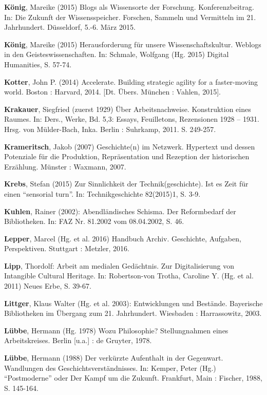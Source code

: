 \documentclass[a4paper,
fontsize=11pt,
oneside,
numbers=noperiodatend,
parskip=half-,
bibliography=totoc,
final
]{scrartcl}
\begin{document}
\textbf{König}, Mareike (2015) Blogs als Wissensorte der Forschung.
Konferenzbeitrag. In: Die Zukunft der Wissensspeicher. Forschen, Sammeln
und Vermitteln im 21. Jahrhundert. Düsseldorf, 5.-6. März 2015.

\textbf{König}, Mareike (2015) Herausforderung für unsere
Wissenschaftskultur. Weblogs in den Geisteswissenschaften. In: Schmale,
Wolfgang (Hg. 2015) Digital Humanities, S. 57-74.

\textbf{Kotter}, John P. (2014) Accelerate. Building strategic agility
for a faster-moving world. Boston : Harvard, 2014. {[}Dt. Übers. München
: Vahlen, 2015{]}.

\textbf{Krakauer}, Siegfried (zuerst 1929) Über Arbeitsnachweise.
Konstruktion eines Raumes. In: Ders., Werke, Bd. 5,3: Essays,
Feuilletons, Rezensionen 1928 -- 1931. Hrsg. von Mülder-Bach, Inka.
Berlin : Suhrkamp, 2011. S. 249-257.

\textbf{Krameritsch}, Jakob (2007) Geschichte(n) im Netzwerk. Hypertext
und dessen Potenziale für die Produktion, Repräsentation und Rezeption
der historischen Erzählung. Münster : Waxmann, 2007.

\textbf{Krebs}, Stefan (2015) Zur Sinnlichkeit der Technik(geschichte).
Ist es Zeit für einen \enquote{sensorial turn}. In: Technikgeschichte
82(2015)1, S. 3-9.

\textbf{Kuhlen}, Rainer (2002): Abendländisches Schisma. Der
Reformbedarf der Bibliotheken. In: FAZ Nr. 81.2002 vom 08.04.2002, S.
46.

\textbf{Lepper}, Marcel (Hg. et al. 2016) Handbuch Archiv. Geschichte,
Aufgaben, Perspektiven. Stuttgart : Metzler, 2016.

\textbf{Lipp}, Thordolf: Arbeit am medialen Gedächtnis. Zur
Digitalisierung von Intangible Cultural Heritage. In: Robertson-von
Trotha, Caroline Y. (Hg. et al. 2011) Neues Erbe, S. 39-67.

\textbf{Littger}, Klaus Walter (Hg. et al. 2003): Entwicklungen und
Bestände. Bayerische Bibliotheken im Übergang zum 21. Jahrhundert.
Wiesbaden : Harrassowitz, 2003.

\textbf{Lübbe}, Hermann (Hg. 1978) Wozu Philosophie? Stellungnahmen
eines Arbeitskreises. Berlin {[}u.a.{]} : de Gruyter, 1978.

\textbf{Lübbe}, Hermann (1988) Der verkürzte Aufenthalt in der
Gegenwart. Wandlungen des Geschichtsverständnisses. In: Kemper, Peter
(Hg.) \enquote{Postmoderne} oder Der Kampf um die Zukunft. Frankfurt,
Main : Fischer, 1988, S. 145-164.
\end{document}
